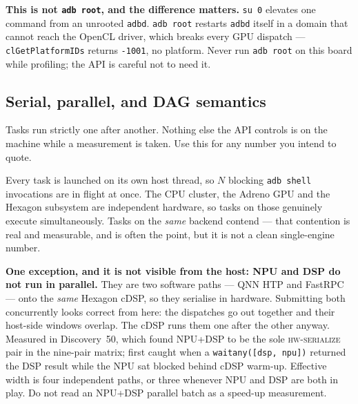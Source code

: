 \documentclass[11pt,a4paper]{article}
\newcommand{\code}[1]{\texttt{\let\_\breakableunderscore #1}}
\newcommand{\breakableunderscore}{\textunderscore\allowbreak}
\begin{document}
\textbf{This is not \code{adb root}, and the difference matters.} \code{su 0}
elevates one command from an unrooted \code{adbd}. \code{adb root} restarts
\code{adbd} itself in a domain that cannot reach the OpenCL driver, which
breaks every GPU dispatch --- \code{clGetPlatformIDs} returns \code{-1001}, no
platform. Never run \code{adb root} on this board while profiling; the API is
careful not to need it.

\subsection{Serial, parallel, and DAG semantics}
\label{sec:parallel}

\begin{description}[leftmargin=1.8cm,style=nextline,font=\normalfont\itshape]
  \item[Serial] Tasks run strictly one after another. Nothing else the API
    controls is on the machine while a measurement is taken. Use this for any
    number you intend to quote.
  \item[Parallel] Every task is launched on its own host thread, so $N$ blocking
    \code{adb shell} invocations are in flight at once. The CPU cluster, the
    Adreno GPU and the Hexagon subsystem are independent hardware, so tasks on
    those genuinely execute simultaneously. Tasks on the \emph{same} backend
    contend --- that contention is real and measurable, and is often the point,
    but it is not a clean single-engine number.

    \textbf{One exception, and it is not visible from the host: NPU and DSP do
    not run in parallel.} They are two software paths --- QNN HTP and FastRPC ---
    onto the \emph{same} Hexagon cDSP, so they serialise in hardware. Submitting
    both concurrently looks correct from here: the dispatches go out together and
    their host-side windows overlap. The cDSP runs them one after the other
    anyway. Measured in Discovery~50, which found NPU+DSP to be the sole
    \textsc{hw-serialize} pair in the nine-pair matrix; first caught when a
    \code{wait\_any([dsp, npu])} returned the DSP result while the NPU sat
    blocked behind cDSP warm-up. Effective width is four independent paths, or
    three whenever NPU and DSP are both in play. Do not read an NPU+DSP parallel
    batch as a speed-up measurement.


\end{description}
\end{document}
